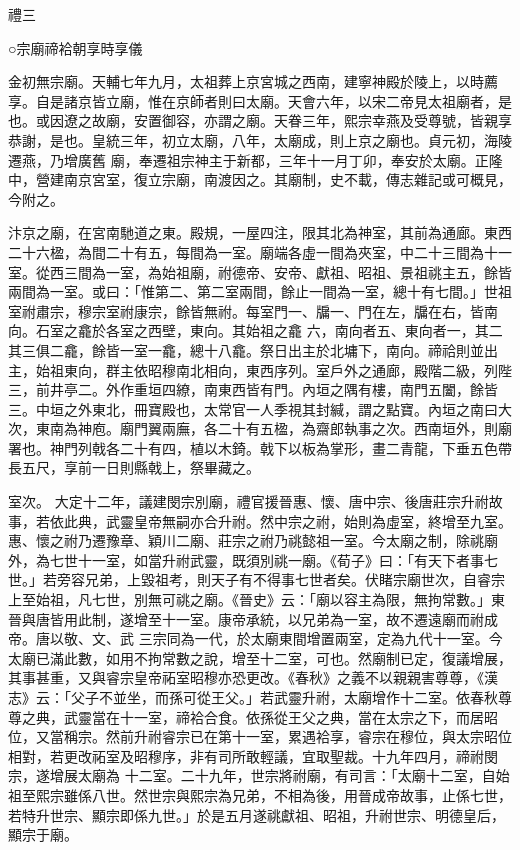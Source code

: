 
\begin{pinyinscope}

 禮三



 ○宗廟禘袷朝享時享儀



 金初無宗廟。天輔七年九月，太祖葬上京宮城之西南，建寧神殿於陵上，以時薦享。自是諸京皆立廟，惟在京師者則曰太廟。天會六年，以宋二帝見太祖廟者，是也。或因遼之故廟，安置御容，亦謂之廟。天眷三年，熙宗幸燕及受尊號，皆親享恭謝，是也。皇統三年，初立太廟，八年，太廟成，則上京之廟也。貞元初，海陵遷燕，乃增廣舊
 廟，奉遷祖宗神主于新都，三年十一月丁卯，奉安於太廟。正隆中，營建南京宮室，復立宗廟，南渡因之。其廟制，史不載，傳志雜記或可概見，今附之。



 汴京之廟，在宮南馳道之東。殿規，一屋四注，限其北為神室，其前為通廊。東西二十六楹，為間二十有五，每間為一室。廟端各虛一間為夾室，中二十三間為十一室。從西三間為一室，為始祖廟，祔德帝、安帝、獻祖、昭祖、景祖祧主五，餘皆兩間為一室。或曰：「惟第二、第二室兩間，餘止一間為一室，總十有七間。」世祖室祔肅宗，穆宗室祔康宗，餘皆無祔。每室門一、牖一、門在左，牖在右，皆南向。石室之龕於各室之西壁，東向。其始祖之龕
 六，南向者五、東向者一，其二其三俱二龕，餘皆一室一龕，總十八龕。祭日出主於北墉下，南向。禘祫則並出主，始祖東向，群主依昭穆南北相向，東西序列。室戶外之通廊，殿階二級，列陛三，前井亭二。外作重垣四繚，南東西皆有門。內垣之隅有樓，南門五闔，餘皆三。中垣之外東北，冊寶殿也，太常官一人季視其封緘，謂之點寶。內垣之南曰大次，東南為神庖。廟門翼兩廡，各二十有五楹，為齋郎執事之次。西南垣外，則廟署也。神門列戟各二十有四，植以木錡。戟下以板為掌形，畫二青龍，下垂五色帶長五尺，享前一日則縣戟上，祭畢藏之。



 室次。
 大定十二年，議建閔宗別廟，禮官援晉惠、懷、唐中宗、後唐莊宗升祔故事，若依此典，武靈皇帝無嗣亦合升祔。然中宗之祔，始則為虛室，終增至九室。惠、懷之祔乃遷豫章、穎川二廟、莊宗之祔乃祧懿祖一室。今太廟之制，除祧廟外，為七世十一室，如當升祔武靈，既須別祧一廟。《荀子》曰：「有天下者事七世。」若旁容兄弟，上毀祖考，則天子有不得事七世者矣。伏睹宗廟世次，自睿宗上至始祖，凡七世，別無可祧之廟。《晉史》云：「廟以容主為限，無拘常數。」東晉與唐皆用此制，遂增至十一室。康帝承統，以兄弟為一室，故不遷遠廟而祔成帝。唐以敬、文、武
 三宗同為一代，於太廟東間增置兩室，定為九代十一室。今太廟已滿此數，如用不拘常數之說，增至十二室，可也。然廟制已定，復議增展，其事甚重，又與睿宗皇帝祏室昭穆亦恐更改。《春秋》之義不以親親害尊尊，《漢志》云：「父子不並坐，而孫可從王父。」若武靈升祔，太廟增作十二室。依春秋尊尊之典，武靈當在十一室，禘袷合食。依孫從王父之典，當在太宗之下，而居昭位，又當稱宗。然前升祔睿宗已在第十一室，累遇袷享，睿宗在穆位，與太宗昭位相對，若更改祏室及昭穆序，非有司所敢輕議，宜取聖裁。十九年四月，禘祔閔宗，遂增展太廟為
 十二室。二十九年，世宗將祔廟，有司言：「太廟十二室，自始祖至熙宗雖係八世。然世宗與熙宗為兄弟，不相為後，用晉成帝故事，止係七世，若特升世宗、顯宗即係九世。」於是五月遂祧獻祖、昭祖，升祔世宗、明德皇后，顯宗于廟。




\end{pinyinscope}
